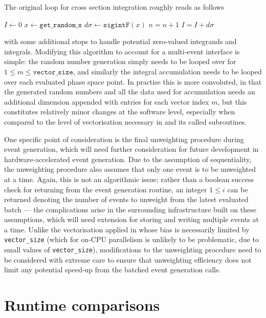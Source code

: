 \documentclass[a4paper,11pt]{article}
\begin{document}
The original loop for cross section integration roughly reads as follows
\begin{algorithmic}
\State $I \gets 0$
\State $x \gets \texttt{get\_random\_x}$
\State $d\sigma \gets \texttt{sigintF}(x)$
\State $n = n+1$
\EndIf
\State $I = I + d \sigma$
\EndWhile
\end{algorithmic}
with some additional stops to handle potential zero-valued integrands and integrals. Modifying this algorithm to account for a multi-event interface is simple: the random number generation simply needs to be looped over for $1\leq m \leq \texttt{vector\_size}$, and similarly the integral accumulation needs to be looped over each evaluated phase space point. In practise this is more convoluted, in that the generated random numbers and all the data used for accumulation needs an additional dimension appended with entries for each vector index $m$, but this constitutes relatively minor changes at the software level, especially when compared to the level of vectorisation necessary in \sigintf and its called subroutines.

One specific point of consideration is the final unweighting procedure during event generation, which will need further consideration for future development in hardware-accelerated event generation. Due to the assumption of sequentiality, the unweighting procedure also assumes that only one event is to be unweighted at a time. Again, this is not an algorithmic issue; rather than a boolean success check for returning from the event generation routine, an integer $1 \leq i$ can be returned denoting the number of events to unweight from the latest evaluated batch --- the complications arise in the surrounding infrastructure built on these assumptions, which will need extension for storing and writing multiple events at a time. Unlike the vectorisation applied in \sigintf whose bias is necessarily limited by \texttt{vector\_size} (which for on-CPU parallelism is unlikely to be problematic, due to small values of \texttt{vector\_size}), modifications to the unweighting procedure need to be considered with extreme care to ensure that unweighting efficiency does not limit any potential speed-up from the batched event generation calls.



\section{Runtime comparisons}
\label{sec:runtime_comp}
\end{document}
